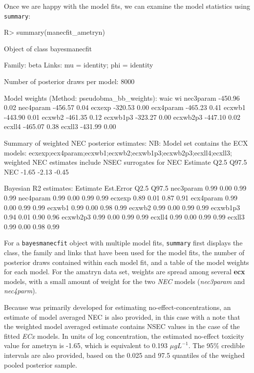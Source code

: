 \documentclass[
  shortnames]{jss}
\begin{document}
Once we are happy with the model fits, we can examine the model statistics using \texttt{summary}:

\begin{CodeChunk}
\begin{CodeInput}
R> summary(manecfit_ametryn)
\end{CodeInput}
\begin{CodeOutput}
Object of class bayesmanecfit

 Family: beta  
  Links: mu = identity; phi = identity  

Number of posterior draws per model:  8000

Model weights (Method: pseudobma_bb_weights):
             waic   wi
nec3param -450.96 0.02
nec4param -456.57 0.04
ecxexp    -320.53 0.00
ecx4param -465.23 0.41
ecxwb1    -443.90 0.01
ecxwb2    -461.35 0.12
ecxwb1p3  -323.27 0.00
ecxwb2p3  -447.10 0.02
ecxll4    -465.07 0.38
ecxll3    -431.99 0.00


Summary of weighted NEC posterior estimates:
NB: Model set contains the ECX models: ecxexp;ecx4param;ecxwb1;ecxwb2;ecxwb1p3;ecxwb2p3;ecxll4;ecxll3; weighted NEC estimates include NSEC surrogates for NEC
    Estimate  Q2.5 Q97.5
NEC    -1.65 -2.13 -0.45


Bayesian R2 estimates:
          Estimate Est.Error Q2.5 Q97.5
nec3param     0.99      0.00 0.99  0.99
nec4param     0.99      0.00 0.99  0.99
ecxexp        0.89      0.01 0.87  0.91
ecx4param     0.99      0.00 0.99  0.99
ecxwb1        0.99      0.00 0.98  0.99
ecxwb2        0.99      0.00 0.99  0.99
ecxwb1p3      0.94      0.01 0.90  0.96
ecxwb2p3      0.99      0.00 0.99  0.99
ecxll4        0.99      0.00 0.99  0.99
ecxll3        0.99      0.00 0.98  0.99
\end{CodeOutput}
\end{CodeChunk}

For a \texttt{bayesmanecfit} object with multiple model fits, \texttt{summary} first displays the class, the family and links that have been used for the model fits, the number of posterior draws contained within each model fit, and a table of the model weights for each model. For the amatryn data set, weights are spread among several \textbf{ecx} models, with a small amount of weight for the two \emph{NEC} models (\emph{nec3param} and \emph{nec4parm}).

Because  was primarily developed for estimating no-effect-concentrations, an estimate of model averaged NEC is also provided, in this case with a note that the weighted model averaged estimate contains NSEC values in the case of the fitted \emph{ECx} models. In units of log concentration, the estimated no-effect toxicity value for ametryn is -1.65, which is equivalent to 0.193 \({\mu}gL^{-1}\). The 95\% credible intervals are also provided, based on the 0.025 and 97.5 quantiles of the weighed pooled posterior sample.
\end{document}
